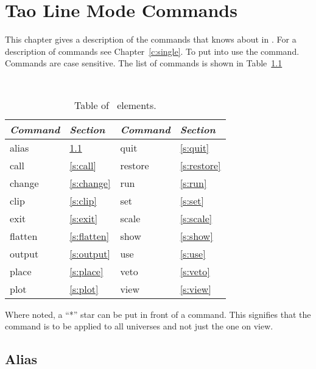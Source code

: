 \chapter{Tao Line Mode Commands}
\label{c:commands}

This chapter gives a description of the commands that \tao knows about
in . For a description of  commands
see Chapter~\ref{c:single}. To put \tao into  use the
 command.
Commands are case sensitive. The list of commands 
is shown in Table~\ref{t:commands}

\begin{table}[h]
\centering
{\tt
\begin{tabular}{|l|l||l|l|} \hline
  {\it Command} & {\it Section}  & {\it Command} & {\it Section} \\ \hline
  alias    & \ref{s:alias}    &  quit    & \ref{s:quit}    \\ \hline
  call     & \ref{s:call}     &  restore & \ref{s:restore} \\ \hline
  change   & \ref{s:change}   &  run     & \ref{s:run}     \\ \hline
  clip     & \ref{s:clip}     &  set     & \ref{s:set}     \\ \hline
  exit     & \ref{s:exit}     &  scale   & \ref{s:scale}   \\ \hline
  flatten  & \ref{s:flatten}  &  show    & \ref{s:show}    \\ \hline
  output   & \ref{s:output}   &  use     & \ref{s:use}     \\ \hline
  place    & \ref{s:place}    &  veto    & \ref{s:veto}    \\ \hline
  plot     & \ref{s:plot}     &  view    & \ref{s:view}    \\ \hline
\end{tabular}
}
\caption{Table of \bmad\ elements.}
\label{t:commands}
\end{table}

Where noted, a ``*'' star can be put in front of a command. This
signifies that the command is to be applied to all universes and not
just the one on view.

\vfil
\break

\section{Alias}
\label{s:alias}

